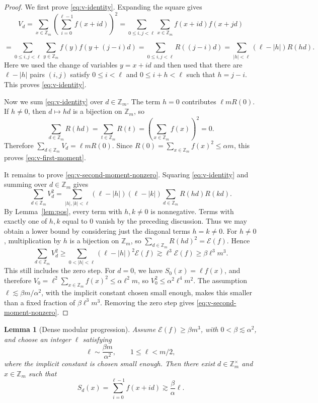\documentclass[11pt]{amsart}
\newcommand{\Z}{\mathbb{Z}}
\newcommand{\abs}[1]{\lvert#1\rvert}
\numberwithin{equation}{section}
\theoremstyle{plain}
\newtheorem{lemma}[theorem]{Lemma}
\theoremstyle{remark}
\begin{document}
\begin{proof}
We first prove \eqref{eq:v-identity}. Expanding the square gives
\[
V_d = \sum_{x\in\mathbb Z_m}\left(\sum_{i=0}^{\ell-1}f(x+id)\right)^2
 = \sum_{0\leq i,j<\ell}\sum_{x\in\mathbb Z_m}f(x+id)f(x+jd)  \]

 \[= \sum_{0\leq i,j<\ell}\sum_{y\in\mathbb Z_m}f(y)f(y+(j-i)d)
 = \sum_{0\leq i,j<\ell} R((j-i)d) = \sum_{|h|<\ell}(\ell-|h|)R(hd).
\]
Here we used the change of variables \(y=x+id\) and then used that there are \(\ell-|h|\) pairs \((i,j)\)  satisfy \(0\leq i<\ell\) and
\(0\leq i+h<\ell\) such that \(h=j-i\). This proves \eqref{eq:v-identity}.


Now we sum \eqref{eq:v-identity} over $d\in\Z_m$. The term $h=0$ contributes
$\ell mR(0)$. If $h\neq0$, then $d\mapsto hd$ is a bijection on $\Z_m$, so
$$
\sum_{d\in\Z_m}R(hd)=\sum_{t\in\Z_m}R(t)=\left(\sum_{x\in\Z_m}f(x)\right)^2=0.
$$
Therefore $\sum_{d\in\Z_m}V_d=\ell mR(0)$. Since
$R(0)=\sum_{x\in\Z_m}f(x)^2\leq \alpha m$, this proves
\eqref{eq:v-first-moment}.

It remains to prove \eqref{eq:v-second-moment-nonzero}. Squaring
\eqref{eq:v-identity} and summing over $d\in\Z_m$ gives
$$
\sum_{d\in\Z_m}V_d^2=
\sum_{\abs{h},\abs{k}<\ell}(\ell-\abs{h})(\ell-\abs{k})
\sum_{d\in\Z_m}R(hd)R(kd).
$$
By Lemma~\ref{lem:pos}, every term with $h,k\neq0$ is nonnegative. Terms with
exactly one of $h,k$ equal to $0$ vanish by the preceding discussion. Thus we
may obtain a lower bound by considering just the diagonal terms $h=k\neq0$. For $h \neq 0$, multiplication by
$h$ is a bijection on $\Z_m$, so $\sum_{d\in\Z_m}R(hd)^2=\mathcal E(f)$. Hence
$$
\sum_{d\in\Z_m}V_d^2\geq \sum_{0<\abs{h}<\ell}(\ell-\abs{h})^2\mathcal E(f)
\gtrsim \ell^3\mathcal E(f)\geq \beta\ell^3m^3.
$$
This still includes the zero step. For $d=0$, we have $S_0(x)=\ell f(x)$, and
therefore $V_0=\ell^2\sum_{x\in\Z_m}f(x)^2\leq \alpha\ell^2m$, so
$V_0^2\leq \alpha^2\ell^4m^2$. The assumption
$\ell\lesssim \beta m/\alpha^2$, with the implicit constant chosen small enough,
makes this smaller than a fixed fraction of $\beta\ell^3m^3$. Removing the zero
step gives \eqref{eq:v-second-moment-nonzero}.
\end{proof}

\begin{lemma}[Dense modular progression]\label{lem:modular}
Assume $\mathcal E(f)\geq\beta m^3$, with $0<\beta\lesssim\alpha^2$, and choose
an integer $\ell$ satisfying
$$
\ell\sim \frac{\beta m}{\alpha^2},\qquad 1\leq \ell<m/2,
$$
where the implicit constant is chosen small enough. Then there exist
$d\in\Z_m^\times$ and $x\in\Z_m$ such that
\begin{equation}\label{eq:modular-increment}
S_d(x)=\sum_{i=0}^{\ell-1} f(x+id)\gtrsim \frac{\beta}{\alpha}\ell.
\end{equation}
\end{lemma}
\end{document}
